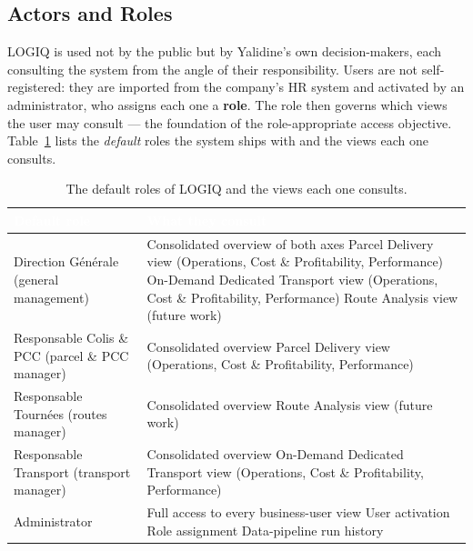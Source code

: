 \subsection{Actors and Roles}

LOGIQ is used not by the public but by Yalidine's own decision-makers, each consulting the system
from the angle of their responsibility. Users are not self-registered: they are imported from the
company's HR system and activated by an administrator, who assigns each one a \textbf{role}. The role
then governs which views the user may consult --- the foundation of the role-appropriate access
objective. Table~\ref{tab:ch4-actors} lists the \emph{default} roles the system ships with and the
views each one consults.

\begin{table}[H]
\centering
\caption{The default roles of LOGIQ and the views each one consults.}
\label{tab:ch4-actors}
\renewcommand{\arraystretch}{1.35}
\begin{tabularx}{\linewidth}{|>{\raggedright\arraybackslash}p{4.3cm}|>{\raggedright\arraybackslash}X|}
\hline
\rowcolor{tblheader}
\textcolor{white}{\textbf{Default role}} & \textcolor{white}{\textbf{What they consult}} \\
\hline
Direction Générale \newline (general management) &
Consolidated overview of both axes \newline
Parcel Delivery view (Operations, Cost \& Profitability, Performance) \newline
On-Demand Dedicated Transport view (Operations, Cost \& Profitability, Performance) \newline
Route Analysis view (future work) \\
Responsable Colis \& PCC \newline (parcel \& PCC manager) &
Consolidated overview \newline
Parcel Delivery view (Operations, Cost \& Profitability, Performance) \\
Responsable Tournées \newline (routes manager) &
Consolidated overview \newline
Route Analysis view (future work) \\
Responsable Transport \newline (transport manager) &
Consolidated overview \newline
On-Demand Dedicated Transport view (Operations, Cost \& Profitability, Performance) \\
Administrator &
Full access to every business-user view \newline
User activation \newline
Role assignment \newline
Data-pipeline run history \\
\hline
\end{tabularx}
\end{table}

